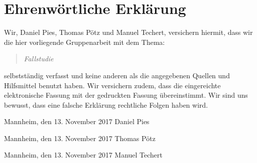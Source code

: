 
\clearpage
\chapter*{Ehrenwörtliche Erklärung}




Wir, Daniel Pies, Thomas Pötz und Manuel Techert, versichern hiermit, dass wir die hier vorliegende Gruppenarbeit mit dem Thema:
 
\begin{quote}
	\textit{Fallstudie \DerTitelDerArbeit}
\end{quote}

selbstständig verfasst und keine anderen als die angegebenen Quellen und Hilfsmittel benutzt haben. Wir versichern zudem, dass die eingereichte elektronische Fassung mit der gedruckten Fassung übereinstimmt. Wir sind uns bewusst, dass eine falsche Erklärung rechtliche Folgen haben wird.

\vspace{2.2cm}
Mannheim, den 13. November 2017 \hfill Daniel Pies

\vspace{2.2cm}
Mannheim, den 13. November 2017 \hfill Thomas Pötz

\vspace{2.2cm}
Mannheim, den 13. November 2017 \hfill Manuel Techert
